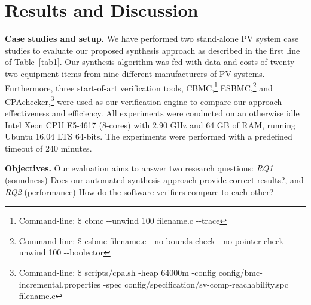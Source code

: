 \documentclass[10pt,conference]{IEEEtran}
\begin{document}
\section{Results and Discussion}
\textbf{Case studies and setup.} We have performed two stand-alone PV system case studies to evaluate our proposed synthesis approach as described in the first line of Table~\ref{tab1}. Our synthesis algorithm was fed with data and costs of twenty-two equipment items from nine different manufacturers of PV systems. Furthermore, three start-of-art verification tools, CBMC,\footnote{Command-line: \$ cbmc -\phantom{}-unwind 100 filename.c -\phantom{}-trace} ESBMC,\footnote{Command-line: \$ esbmc filename.c -\phantom{}-no-bounds-check -\phantom{}-no-pointer-check -\phantom{}-unwind 100 -\phantom{}-boolector} %
and CPAchecker,\footnote{Command-line: \$ scripts/cpa.sh -heap 64000m -config config/bmc-incremental.properties -spec config/specification/sv-comp-reachability.spc filename.c} were used as our verification engine to compare our approach effectiveness and efficiency. 
All experiments were conducted on an otherwise idle Intel Xeon CPU E5-4617 (8-cores) with 2.90 GHz and 64 GB of RAM, running Ubuntu 16.04 LTS 64-bits. 
The experiments were performed with a predefined timeout of $240$ minutes.

\textbf{Objectives.} Our evaluation aims to answer two research questions: \textit{RQ1} (soundness) Does our automated synthesis approach provide correct results?, and \textit{RQ2} (performance) How do the software verifiers compare to each other?
\end{document}
